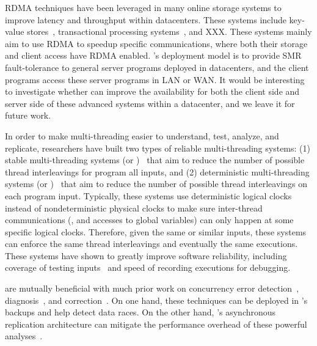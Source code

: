  RDMA techniques have been leveraged in many online 
storage systems to improve latency and throughput within datacenters. These 
systems include key-value stores~\cite{jinyang,herd,farm}, transactional 
processing systems~\cite{haibo,microsoft:sosp15}, and XXX. These systems mainly 
aim to use RDMA to speedup specific communications, where both their storage 
and client access have RDMA enabled. \xxx's deployment model is to provide 
SMR fault-tolerance to general server programs deployed in datacenters, and the 
client programs access these server programs in LAN or WAN. It 
would be interesting to investigate whether \xxx can improve the availability 
for both the client side and server side of these advanced systems within a 
datacenter, and we leave it for future work.



 In order to make multi-threading easier to 
understand, test, analyze, and replicate, researchers have built two types of 
reliable multi-threading systems: (1) stable multi-threading systems (or 
\smt)~\cite{grace:oopsla09, dthreads:sosp11, determinator:osdi10} that aim to 
reduce the number of possible thread interleavings for program all inputs, and 
(2) deterministic multi-threading systems (or \dmt)~\cite{dpj:oopsla09, 
dmp:asplos09,kendo:asplos09,coredet:asplos10,dos:osdi10,ddos:asplos13,
ics:oopsla13} that aim to reduce the number of possible thread interleavings on 
each program input. Typically, these systems use deterministic logical clocks 
instead of nondeterministic physical clocks to make sure inter-thread 
communications (\eg, \mutexlock and accesses to global variables) can only 
happen at some specific logical clocks. Therefore, given the same or similar 
inputs, these systems can enforce the same thread interleavings and eventually 
the same executions. These systems 
have shown to greatly improve software reliability, including coverage of 
testing inputs~\cite{ics:oopsla13} and speed of recording 
executions\cite{dos:osdi10} for debugging.

 \xxx are mutually beneficial with much prior work on 
concurrency error 
detection~\cite{yu:racetrack:sosp,savage:eraser,racerx:sosp03,lu:muvi:sosp,
avio:asplos06,conmem:asplos10},
diagnosis~\cite{racefuzzer:pldi08,ctrigger:asplos09,atomfuzzer:fse08}, and
correction~\cite{dimmunix:osdi08,gadara:osdi08,wu:loom:osdi10,cfix:osdi12}. 
On one hand, these techniques can be deployed in \xxx's backups and help 
\xxx detect data races. On the other hand, \xxx's asynchronous replication 
architecture can mitigate the performance overhead of these powerful 
analyses~\cite{repframe:apsys15}.


